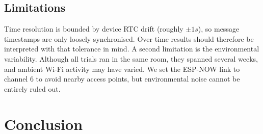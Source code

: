 \documentclass[conference]{IEEEtran}
\begin{document}


\subsection{Limitations}

Time resolution is bounded by device RTC drift (roughly $\pm1s$), so message timestamps are only loosely synchronised. Over time results should therefore be interpreted with that tolerance in mind. A second limitation is the environmental variability. Although all trials ran in the same room, they spanned several weeks, and ambient Wi-Fi activity may have varied. We set the ESP-NOW link to channel 6 to avoid nearby access points, but environmental noise cannot be entirely ruled out.


\section{Conclusion}
\end{document}
